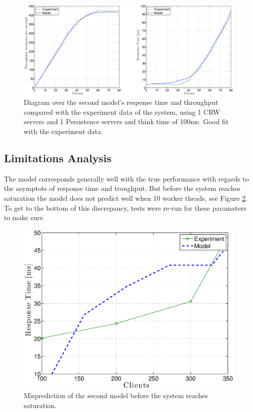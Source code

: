 \documentclass[a4paper, 11pt]{article}
\begin{document}
	\begin{figure}[ch!]
		\centering
			\includegraphics[width=1\linewidth,keepaspectratio]{secondRealAndModel1Thread}
		\caption{Diagram over the second model's response time and throughput compared with the experiment data of the system, using 1 CRW servers and 1 Persistence servers and think time of 100ms. Good fit with the experiment data.}
		\label{fig:secondmodelResults-1-th}
	\end{figure}
	\FloatBarrier

	\subsection{Limitations Analysis}
	The model corresponds generally well with the true performance with regards to the asymptots of response time and troughput. But before the system reaches saturation the model does not predict well when 10 worker theads, see Figure \ref{fig:secondmodelResults-error}. To get to the bottom of this discrepancy, tests were re-run for these paramaters to make sure 

	\FloatBarrier
	\begin{figure}[ch!]
		\centering
			\includegraphics[width=0.8\linewidth,keepaspectratio]{secondRealAndModelError}
		\caption{Misprediction of the second model before the system reaches saturation.}
		\label{fig:secondmodelResults-error}
	\end{figure}
	\FloatBarrier
\end{document}
